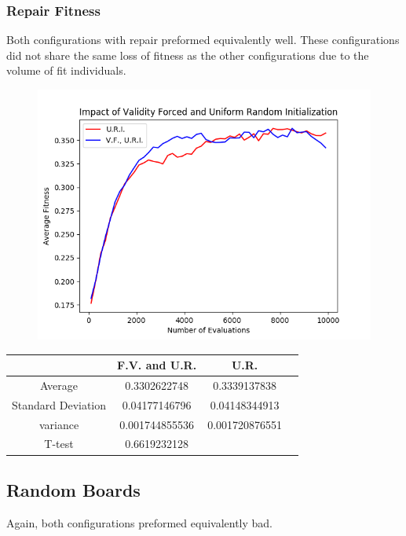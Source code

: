 \documentclass{article}
\begin{document}
		\subsubsection{Repair Fitness}
			Both configurations with repair preformed equivalently well. These configurations
			did not share the same loss of fitness as the other configurations due to the 
			volume of fit individuals.
			\begin{figure}[!htb]
			\centering
			\includegraphics[scale=0.4]{q2_assigned_board_repair_ur_vs_vfur.png}
			\end{figure}
			\begin{center}
			\begin{tabular}{ || c | c | c | c ||}
			\hline
			       & F.V. and U.R. & U.R.\\ 
			 \hline\hline
			 Average & 0.3302622748 &	0.3339137838 \\ 
			 \hline
			 Standard Deviation &	0.04177146796 &	0.04148344913\\
			 \hline
			 variance &	0.001744855536 &	0.001720876551 \\
			 \hline
			 T-test &	0.6619232128	& \\
			 \hline
			\end{tabular}
			\end{center}

	\subsection{Random Boards}
			Again, both configurations preformed equivalently bad.
\end{document}
